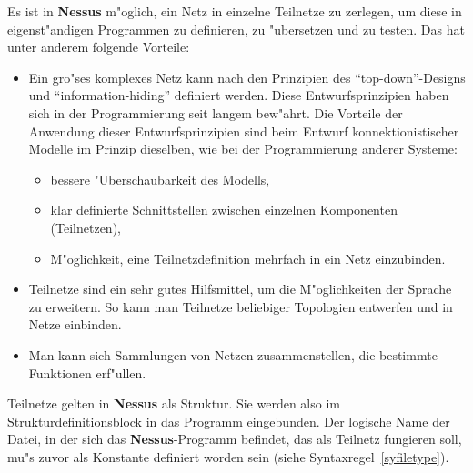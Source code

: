 Es ist in {\bf Nessus} m"oglich, ein Netz  in einzelne Teilnetze zu zerlegen, um diese in
eigenst"andigen Programmen zu definieren, zu "ubersetzen und zu testen. Das hat unter anderem
folgende Vorteile: 
\begin{itemize}
  \item Ein gro"ses komplexes Netz kann nach den Prinzipien des ``top-down''-Designs und
	``information-hiding'' definiert werden. Diese
Entwurfsprinzipien haben sich in der Programmierung 
	seit langem bew"ahrt. Die Vorteile der Anwendung dieser Entwurfsprinzipien sind beim Entwurf
	konnektionistischer Modelle im Prinzip dieselben, wie bei der Programmierung anderer
	Systeme: 
	\begin{itemize}
	  \item bessere "Uberschaubarkeit des Modells,
	  \item klar definierte Schnittstellen zwischen einzelnen Komponenten (Teilnetzen),
	  \item M"oglichkeit, eine Teilnetzdefinition mehrfach in ein Netz einzubinden.
	\end{itemize}
  \item Teilnetze sind ein sehr gutes Hilfsmittel, um die M"oglichkeiten der Sprache zu erweitern.
	So kann man Teilnetze beliebiger Topologien entwerfen und in Netze einbinden.
  \item Man kann sich Sammlungen von Netzen zusammenstellen, die bestimmte Funktionen erf"ullen.
\end{itemize}

Teilnetze gelten in {\bf Nessus} als Struktur. Sie werden also im
Strukturdefinitionsblock in das Programm
eingebunden. Der logische Name der Datei, in
der sich das {\bf Nessus}-Programm befindet, das als
Teilnetz fungieren soll, mu"s zuvor als
Konstante definiert worden sein (siehe
Syntaxregel~\ref{syfiletype}).

\begin{center}
\end{center}

